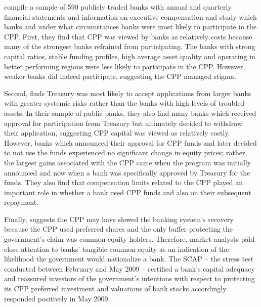 \documentclass[12pt]{article}
\begin{document}
\citet{Ba} compile a sample of 590 publicly traded banks with annual and quarterly financial statements and information on executive compensation and study which banks and under what circumstances banks were most likely to participate in the CPP. First, they find that CPP was viewed by banks as relatively costs because many of the strongest banks refrained from participating. The banks with strong capital ratios, stable funding profiles, high average asset quality and operating in better performing regions were less likely to participate in the CPP. However, weaker banks did indeed participate, suggesting the CPP managed stigma. 

Second, \citet{Ba} finds Treasury was most likely to accept applications from larger banks with greater systemic risks rather than the banks with high levels of troubled assets. In their sample of public banks, they also find many banks which received approval for participation from Treasury but ultimately decided to withdraw their application, suggesting CPP capital was viewed as relatively costly. However, banks which announced their approval for CPP funds and later decided to not use the funds experienced no significant change in equity prices; rather, the largest gains associated with the CPP came when the program was initially announced and now when a bank was specifically approved by Treasury for the funds. They also find that compensation limits related to the CPP played an important role in whether a bank used CPP funds and also on their subsequent repayment. 

Finally, \citet{Ba} suggests the CPP may have slowed the banking system's recovery because the CPP used preferred shares and the only buffer protecting the government's claim was common equity holders. Therefore, market analysts paid close attention to banks' tangible common equity as an indication of the likelihood the government would nationalize a bank. The SCAP -- the stress test conducted between February and May 2009 -- certified a bank's capital adequacy and reassured investors of the government's intentions with respect to protecting its CPP preferred investment and valuations of bank stocks accordingly responded positively in May 2009. 
\end{document}

